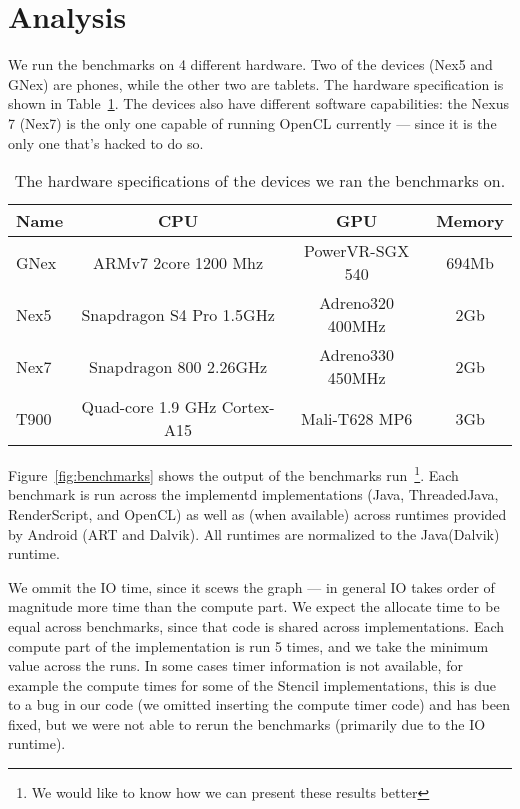 \section*{Analysis}
\label{sec:analysis}

We run the benchmarks on 4 different hardware.
Two of the devices (Nex5 and GNex) are phones, while the other two are tablets.
The hardware specification is shown in Table~\ref{table:hardware}.
The devices also have different software capabilities: the Nexus 7 (Nex7)
  is the only one capable of running OpenCL currently --- since it is the only
  one that's hacked to do so.

\begin{table}[h]\small
\centering
\begin{tabular}{ | l | c | c | c |}
    \hline 
    Name & CPU & GPU & Memory \\ \hline
    GNex & ARMv7 2core 1200 Mhz & PowerVR-SGX 540 & 694Mb \\ \hline
    Nex5 & Snapdragon S4 Pro 1.5GHz & Adreno320 400MHz & 2Gb} \\ \hline
    Nex7 & Snapdragon 800 2.26GHz & Adreno330 450MHz & 2Gb} \\ \hline
    T900 & Quad-core 1.9 GHz Cortex-A15 & Mali-T628 MP6 & 3Gb} \\ \hline
    \hline
\end{tabular}
\caption{The hardware specifications of the devices we ran the benchmarks on.}
\label{table:hardware}
\end{table}

Figure~\ref{fig:benchmarks} shows the output of the benchmarks run~\footnote{We would like to know how we can present these results better}.
Each benchmark is run across the implementd implementations (Java, ThreadedJava, RenderScript, and OpenCL) as well as (when available) across runtimes provided by Android (ART and Dalvik).
All runtimes are normalized to the Java(Dalvik) runtime.

We ommit the IO time, since it scews the graph --- in general IO takes 
  order of magnitude more time than the compute part.
We expect the allocate time to be equal across benchmarks, since
  that code is shared across implementations.
Each compute part of the implementation is run 5 times, and we 
  take the minimum value across the runs.
In some cases timer information is not available, for example the compute times for some of the Stencil implementations, this is due to a bug in our code (we omitted inserting the compute timer code) and has been fixed, but we were not able to rerun the benchmarks (primarily due to the IO runtime).


